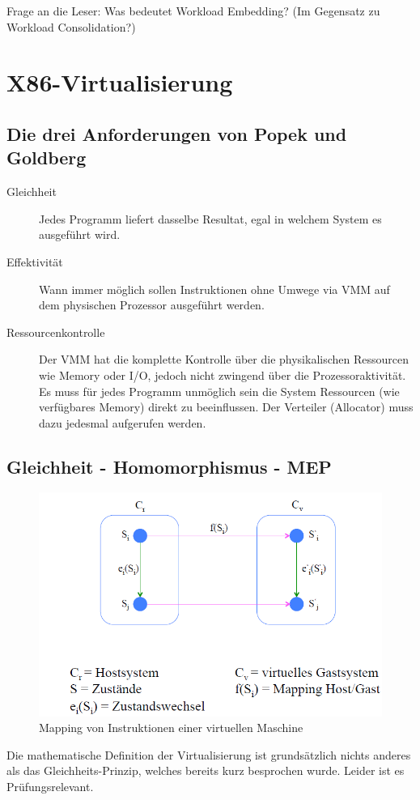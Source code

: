 Frage an die Leser: Was bedeutet Workload Embedding? (Im Gegensatz zu Workload Consolidation?)

\section{X86-Virtualisierung}
\subsection{Die drei Anforderungen von Popek und Goldberg}
\label{sec:popek-goldberg-anforderungen}
\begin{description}
	\item[Gleichheit] Jedes Programm liefert dasselbe Resultat, egal in welchem System es ausgeführt wird.
	\item[Effektivität] Wann immer möglich sollen Instruktionen ohne Umwege via VMM auf dem physischen Prozessor ausgeführt werden.
	\item[Ressourcenkontrolle] Der VMM hat die komplette Kontrolle über die physikalischen Ressourcen wie Memory oder I/O, jedoch nicht zwingend über die Prozessoraktivität. Es muss für jedes Programm unmöglich sein die System Ressourcen (wie verfügbares Memory) direkt zu beeinflussen. Der Verteiler (Allocator) muss dazu jedesmal aufgerufen werden.
\end{description}

\subsection{Gleichheit - Homomorphismus - MEP}
\begin{figure}[]
\centering
\includegraphics[width=0.7\linewidth]{fig/popek_goldberg_mapping}
\caption{Mapping von Instruktionen einer virtuellen Maschine}
\label{fig:popek_goldberg_mapping}
\end{figure}
Die mathematische Definition der Virtualisierung ist grundsätzlich nichts anderes als das Gleichheits-Prinzip, welches bereits kurz besprochen wurde. Leider ist es Prüfungsrelevant.

